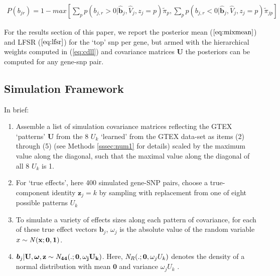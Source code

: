 \begin{enumerate}
\begin{equation}
  \label{eq:lfsr}
\begin{split}
P(b_{jr})= 1-max[{\sum_{p}}p({b_{j,r}}>0|\hat{\bm{b}}_{j}, \hat{V}_{j}, z_{j}=p)\tilde \pi_{p}, {\sum_{p}}p({b_{j,r}}<0|\hat{\bm{b}}_{j}, \hat{V}_{j}, z_{j}=p)\tilde \pi_{jp}]
\end{split}
\end{equation}

For the results section of this paper, we report the  posterior mean ($\ref{eq:mixmean}$) and LFSR ($\ref{eq:lfsr}$) for the `top' snp per gene, but armed with the hierarchical weights computed in (\ref{eq:cdll}) and covariance matrices $\textbf{U}$ the posteriors can be computed for any gene-snp pair.

\subsection{Simulation Framework}\label{sssec:simulation}


In brief:
\begin{enumerate}
\item Assemble a list of simulation covariance matrices reflecting the GTEX `patterns' $\bm{U}$ from the 8 $U_{k}$ `learned' from the GTEX data-set as items (2) through (5) (see Methods \ref{sssec:num1} for details)  scaled by the maximum value along the diagonal, such that the maximal value along the diagonal of all 8 $U_{k}$ is 1.
\item For `true effects', here 400 simulated gene-SNP pairs, choose a true-component identity $\bm{z}_{j}=k$ by sampling with replacement from one of eight possible patterns $U_{k}$ 
\item To simulate a variety of effects sizes along each pattern of covariance, for each of these true effect vectors $\bm{b}_{j}$, $\omega_{j}$ is the absolute value of  the random variable $x \sim {\it N}(\bf{x}; \bm{0}, 1)$.
\item $ \bm{b}_{j}  | \bf{U}, \bm{\omega}, \bm{z} \sim{\it N}_{44} (.; \bm{0}, \omega_j U_{k})$. Here, ${\it N}_R(.; \bm{0}, \omega_j U_{k})$ denotes the density of a normal distribution with mean $\bm{0}$ and variance $\omega_j U_{k}$ .


\end{enumerate}
\end{enumerate}
